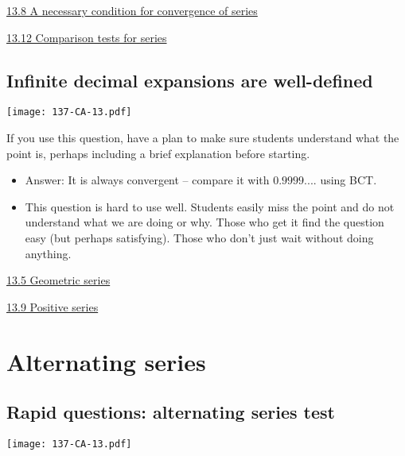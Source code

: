 \documentclass[11pt]{article}
\newcommand {\DS} [1] {${\displaystyle #1}$}
\newcommand{\nl}{\hfill \vspace{-1.1\baselineskip}} %
\newcommand{\vv}{\hspace{8mm} \href{https://www.youtube.com/watch?v=IjTJP3ssOkk&list=PLlwePzQY_wW-FJMnD_ybkXU_jZLVtZttI&index=5}{13.5 Geometric series} }
\newcommand{\vviii}{\hspace{8mm} \href{https://www.youtube.com/watch?v=kP9qHkTSNpI&list=PLlwePzQY_wW-FJMnD_ybkXU_jZLVtZttI&index=8}{13.8 A necessary condition for convergence of series} }
\newcommand{\vix}{\hspace{8mm} \href{https://www.youtube.com/watch?v=_7qwFfSjBtE&list=PLlwePzQY_wW-FJMnD_ybkXU_jZLVtZttI&index=9}{13.9 Positive series} }
\newcommand{\vxii}{\hspace{8mm} \href{https://www.youtube.com/watch?v=QbYK4COJUqU&list=PLlwePzQY_wW-FJMnD_ybkXU_jZLVtZttI&index=12}{13.12 Comparison tests for series} }
\begin{document}
\begin{videos}
\vviii

\vxii
\end{videos}

\newpage
\subsection{Infinite decimal expansions are well-defined}

\begin{center}
{ \texttt{[image: 137-CA-13.pdf]}} 
\end{center}

\begin{warning}
	If you use this question, have a plan to make sure students understand what the point is, perhaps including a brief explanation before starting.
\end{warning}


\begin{comments}
\nl
	\begin{itemize}
		\item   Answer:  It is always convergent -- compare it with \DS{0.9999....} using BCT.
		\item   This question is hard to use well.   Students easily miss the point and do not understand what we are doing or why.  Those who get it find the question easy (but perhaps satisfying).  Those who don't just wait without doing anything.
	\end{itemize}
\end{comments}

\begin{videos}
\vv

\vix
\end{videos}

\newpage
\section{Alternating series}
\subsection{Rapid questions: alternating series test}

\begin{center}
{ \texttt{[image: 137-CA-13.pdf]}} 
\end{center}
\end{document}
